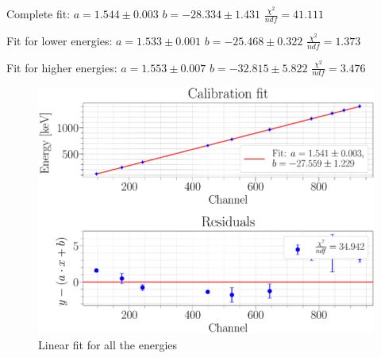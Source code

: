 \documentclass[a4paper,12pt]{article}
\begin{document}
Complete fit: \newline
$a = 1.544\pm0.003$ \newline
$b = -28.334\pm1.431$ \newline
$\frac{\chi^2}{ndf} = 41.111$ \newline

Fit for lower energies: \newline
$a = 1.533\pm0.001$ \newline
$b = -25.468\pm0.322$ \newline
$\frac{\chi^2}{ndf} = 1.373$ \newline

Fit for higher energies: \newline
$a = 1.553\pm0.007$ \newline
$b = -32.815\pm5.822$ \newline
$\frac{\chi^2}{ndf} = 3.476$ \newline



\begin{figure}[H]
\centering
\includegraphics[scale=0.25]{../Figures/Calibration_fit.eps}
\caption{Linear fit for all the energies}
\label{calibFit}
\end{figure}
\end{document}
